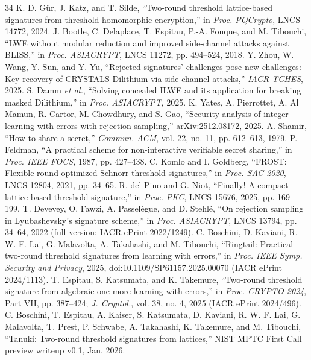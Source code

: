\documentclass[10pt,conference,a4paper]{IEEEtran}
\begin{document}
\begin{thebibliography}{34}
 K. D. G\"ur, J. Katz, and T. Silde, ``Two-round threshold lattice-based signatures from threshold homomorphic encryption,'' in \emph{Proc. PQCrypto}, LNCS 14772, 2024.
 J. Bootle, C. Delaplace, T. Espitau, P.-A. Fouque, and M. Tibouchi, ``LWE without modular reduction and improved side-channel attacks against BLISS,'' in \emph{Proc. ASIACRYPT}, LNCS 11272, pp. 494--524, 2018.
 Y. Zhou, W. Wang, Y. Sun, and Y. Yu, ``Rejected signatures' challenges pose new challenges: Key recovery of CRYSTALS-Dilithium via side-channel attacks,'' \emph{IACR TCHES}, 2025.
 S. Damm \emph{et al.}, ``Solving concealed ILWE and its application for breaking masked Dilithium,'' in \emph{Proc. ASIACRYPT}, 2025.
 K. Yates, A. Pierrottet, A. Al Mamun, R. Cartor, M. Chowdhury, and S. Gao, ``Security analysis of integer learning with errors with rejection sampling,'' arXiv:2512.08172, 2025.
 A. Shamir, ``How to share a secret,'' \emph{Commun. ACM}, vol. 22, no. 11, pp. 612--613, 1979.
 P. Feldman, ``A practical scheme for non-interactive verifiable secret sharing,'' in \emph{Proc. IEEE FOCS}, 1987, pp. 427--438.
 C. Komlo and I. Goldberg, ``FROST: Flexible round-optimized Schnorr threshold signatures,'' in \emph{Proc. SAC 2020}, LNCS 12804, 2021, pp. 34--65.
 R. del Pino and G. Niot, ``Finally! A compact lattice-based threshold signature,'' in \emph{Proc. PKC}, LNCS 15676, 2025, pp. 169--199.
 T. Devevey, O. Fawzi, A. Passel\`egue, and D. Stehl\'e, ``On rejection sampling in Lyubashevsky's signature scheme,'' in \emph{Proc. ASIACRYPT}, LNCS 13794, pp. 34--64, 2022 (full version: IACR ePrint 2022/1249).
 C. Boschini, D. Kaviani, R. W. F. Lai, G. Malavolta, A. Takahashi, and M. Tibouchi, ``Ringtail: Practical two-round threshold signatures from learning with errors,'' in \emph{Proc. IEEE Symp. Security and Privacy}, 2025, doi:10.1109/SP61157.2025.00070 (IACR ePrint 2024/1113).
 T. Espitau, S. Katsumata, and K. Takemure, ``Two-round threshold signature from algebraic one-more learning with errors,'' in \emph{Proc. CRYPTO 2024}, Part VII, pp. 387--424; \emph{J. Cryptol.}, vol. 38, no. 4, 2025 (IACR ePrint 2024/496).
 C. Boschini, T. Espitau, A. Kaiser, S. Katsumata, D. Kaviani, R. W. F. Lai, G. Malavolta, T. Prest, P. Schwabe, A. Takahashi, K. Takemure, and M. Tibouchi, ``Tanuki: Two-round threshold signatures from lattices,'' NIST MPTC First Call preview writeup v0.1, Jan. 2026.

\end{thebibliography}
\end{document}
